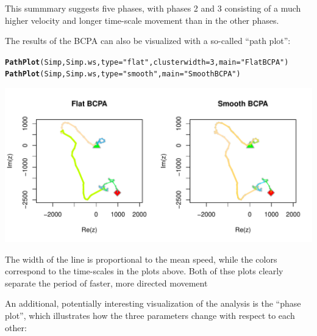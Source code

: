 \documentclass[10pt]{article}\usepackage[]{graphicx}\usepackage[]{color}
\makeatletter
\def\maxwidth{ %
  \ifdim\Gin@nat@width>\linewidth
    \linewidth
  \else
    \Gin@nat@width
  \fi
}
\newcommand{\hlnum}[1]{\textcolor[rgb]{0.686,0.059,0.569}{#1}}%
\newcommand{\hlstr}[1]{\textcolor[rgb]{0.192,0.494,0.8}{#1}}%
\newcommand{\hlstd}[1]{\textcolor[rgb]{0.345,0.345,0.345}{#1}}%
\newcommand{\hlkwc}[1]{\textcolor[rgb]{0.333,0.667,0.333}{#1}}%
\newcommand{\hlkwd}[1]{\textcolor[rgb]{0.737,0.353,0.396}{\textbf{#1}}}%
\newenvironment{kframe}{%
 \def\at@end@of@kframe{}%
 \ifinner\ifhmode%
  \def\at@end@of@kframe{\end{minipage}}%
  \begin{minipage}{\columnwidth}%
 \fi\fi%
 \def\FrameCommand##1{\hskip\@totalleftmargin \hskip-\fboxsep
 \colorbox{shadecolor}{##1}\hskip-\fboxsep
     \hskip-\linewidth \hskip-\@totalleftmargin \hskip\columnwidth}%
 \MakeFramed {\advance\hsize-\width
   \@totalleftmargin\z@ \linewidth\hsize
   \@setminipage}}%
 {\par\unskip\endMakeFramed%
 \at@end@of@kframe}
\newenvironment{knitrout}{}{} %
\makeatother
\begin{document}
This summmary suggests five phases, with phases 2 and 3 consisting of a much higher velocity and longer time-scale movement than in the other phases.

The results of the BCPA can also be visualized with a so-called ``path plot'':
\begin{knitrout}
\color{fgcolor}\begin{kframe}
\begin{alltt}
\hlkwd{PathPlot}\hlstd{(Simp, Simp.ws,} \hlkwc{type} \hlstd{=} \hlstr{"flat"}\hlstd{,} \hlkwc{clusterwidth} \hlstd{=} \hlnum{3}\hlstd{,} \hlkwc{main} \hlstd{=} \hlstr{"Flat BCPA"}\hlstd{)}
\hlkwd{PathPlot}\hlstd{(Simp, Simp.ws,} \hlkwc{type} \hlstd{=} \hlstr{"smooth"}\hlstd{,} \hlkwc{main} \hlstd{=} \hlstr{"Smooth BCPA"}\hlstd{)}
\end{alltt}
\end{kframe}
\includegraphics[width=\maxwidth]{figure/BCPApaths} 

\end{knitrout}

The width of the line is proportional to the mean speed, while the colors correspond to the time-scales in the plots above.  Both of thse plots clearly separate the period of faster, more directed movement

An additional, potentially interesting visualization of the analysis is the ``phase plot'', which illustrates how the three parameters change with respect to each other:
\end{document}

